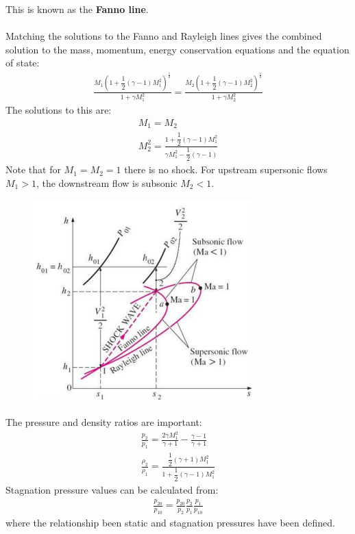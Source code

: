 This is known as the \textbf{Fanno line}.
\\\\
Matching the solutions to the Fanno and Rayleigh lines gives the combined solution to the mass, momentum, energy conservation equations and the equation of state:
\begin{gather}
    \frac{M_1 \left( 1+\dfrac{1}{2}(\gamma-1)M_1^2 \right)^{\frac{1}{2}}}{1+\gamma M_1^2} = \frac{M_2 \left( 1+\dfrac{1}{2}(\gamma-1)M_2^2 \right)^{\frac{1}{2}}}{1+\gamma M_2^2}
\end{gather}
The solutions to this are:
\begin{gather}
    M_1 = M_2 \\[5pt]
    M_2^2 = \frac{1+\dfrac{1}{2}(\gamma-1)M_1^2}{\gamma M_1^2 - \dfrac{1}{2}(\gamma-1)}
\end{gather}
Note that for $M_1 = M_2 = 1$ there is no shock. For upstream supersonic flows $M_1>1$, the downstream flow is subsonic $M_2<1$.
\begin{figure}[H]
    \centering
    \includegraphics[width = 0.55 \textwidth]{./img/diagram6.PNG}
    \caption{}
\end{figure}
The pressure and density ratios are important:
\begin{gather}
    \frac{p_2}{p_1} = \frac{2\gamma M_1^2}{\gamma+1}-\frac{\gamma-1}{\gamma+1} \\[5pt]
    \frac{\rho_2}{\rho_1} = \frac{\dfrac{1}{2}(\gamma+1)M_1^2}{1+\dfrac{1}{2}(\gamma-1)M_1^2}
\end{gather}
Stagnation pressure values can be calculated from:
\begin{gather}
    \frac{p_{20}}{p_{10}} = \frac{p_{20}}{p_{2}}\frac{p_2}{p_1}\frac{p_1}{p_{10}}
\end{gather}
where the relationship been static and stagnation pressures have been defined.
